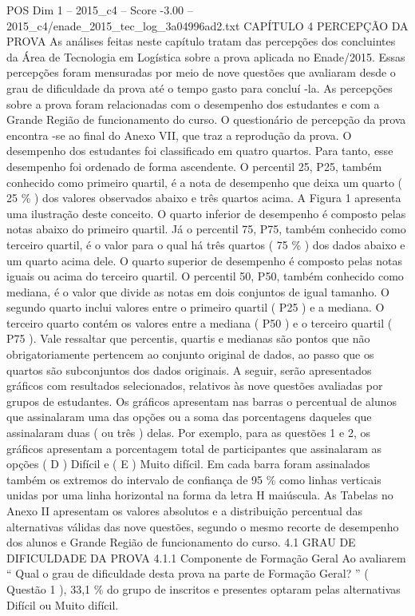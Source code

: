 \begin{textsample}{POS Dim 1 – 2015\_c4 – Score -3.00 – 2015\_c4/enade\_2015\_tec\_log\_3a04996ad2.txt}  \label{ex:f1_pos_332}
CAPÍTULO 4 PERCEPÇÃO DA PROVA As análises feitas neste capítulo tratam das percepções dos concluintes da Área de Tecnologia em Logística sobre a prova aplicada no Enade/2015.
Essas percepções foram mensuradas por meio de nove questões que avaliaram desde o grau de dificuldade da prova até o tempo gasto para concluí -la.
As percepções sobre a prova foram relacionadas com o desempenho dos estudantes e com a Grande Região de funcionamento do curso.
O questionário de percepção da prova encontra -se ao final do Anexo VII, que traz a reprodução da prova.
O desempenho dos estudantes foi classificado em quatro quartos.
Para tanto, esse desempenho foi ordenado de forma ascendente.
O percentil 25, P25, também conhecido como primeiro quartil, é a nota de desempenho que deixa um quarto ( 25 \% ) dos valores observados abaixo e três quartos acima.
A Figura 1 apresenta uma ilustração deste conceito.
O quarto inferior de desempenho é composto pelas notas abaixo do primeiro quartil.
Já o percentil 75, P75, também conhecido como terceiro quartil, é o valor para o qual há três quartos ( 75 \% ) dos dados abaixo e um quarto acima dele.
O quarto superior de desempenho é composto pelas notas iguais ou acima do terceiro quartil.
O percentil 50, P50, também conhecido como mediana, é o valor que divide as notas em dois conjuntos de igual tamanho.
O segundo quarto inclui valores entre o primeiro quartil ( P25 ) e a mediana.
O terceiro quarto contém os valores entre a mediana ( P50 ) e o terceiro quartil ( P75 ).
Vale ressaltar que percentis, quartis e medianas são pontos que não obrigatoriamente pertencem ao conjunto original de dados, ao passo que os quartos são subconjuntos dos dados originais.
A seguir, serão apresentados gráficos com resultados selecionados, relativos às nove questões avaliadas por grupos de estudantes.
Os gráficos apresentam nas barras o percentual de alunos que assinalaram uma das opções ou a soma das porcentagens daqueles que assinalaram duas ( ou três ) delas.
Por exemplo, para as questões 1 e 2, os gráficos apresentam a porcentagem total de participantes que assinalaram as opções ( D ) Difícil e ( E ) Muito difícil.
Em cada barra foram assinalados também os extremos do intervalo de confiança de 95 \% como linhas verticais unidas por uma linha horizontal na forma da letra H maiúscula.
As Tabelas no Anexo II apresentam os valores absolutos e a distribuição percentual das alternativas válidas das nove questões, segundo o mesmo recorte de desempenho dos alunos e Grande Região de funcionamento do curso. 4.1 GRAU DE DIFICULDADE DA PROVA 4.1.1 Componente de Formação Geral Ao avaliarem “ Qual o grau de dificuldade desta prova na parte de Formação Geral? ” ( Questão 1 ), 33,1 \% do grupo de inscritos e presentes optaram pelas alternativas Difícil ou Muito difícil.

\end{textsample}
